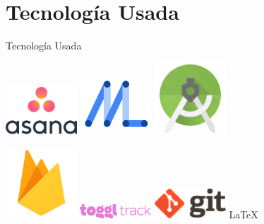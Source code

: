 \documentclass[12pt]{beamer}
\begin{document}
\section{Tecnología Usada}
\begin{frame}{Tecnología Usada}

\begin{center}

\includegraphics[width=0.2\textwidth]{asana}
\includegraphics[width=0.2\textwidth]{mlkit}
\includegraphics[width=0.2\textwidth]{androidstudio}

\includegraphics[width=0.2\textwidth]{firebase}
\includegraphics[width=0.2\textwidth]{toggl}
\includegraphics[width=0.2\textwidth]{git}
{\LARGE \LaTeX}
\end{center}
\end{frame}
\end{document}
